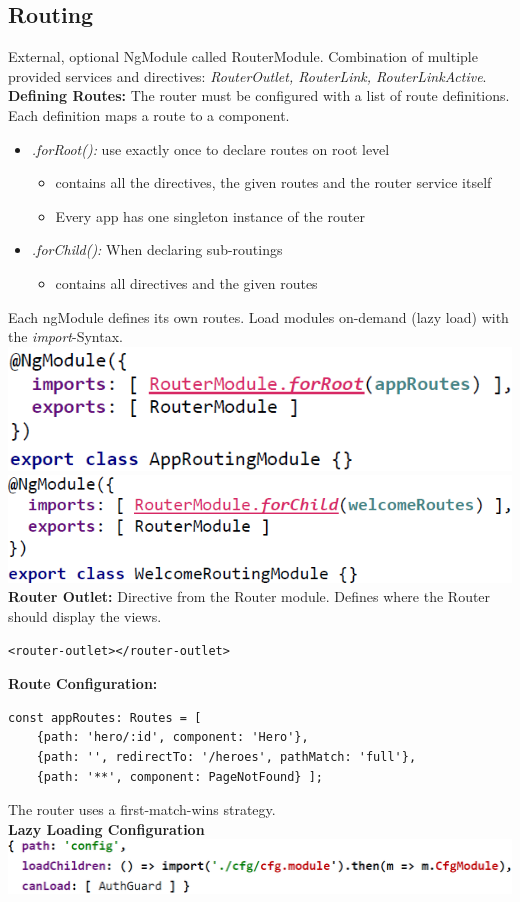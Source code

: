 \subsection{Routing}
External, optional NgModule called RouterModule.
Combination of multiple provided services and directives: \textit{RouterOutlet, RouterLink, RouterLinkActive}.\\
\textbf{Defining Routes:} The router must be configured with a list of route definitions.
Each definition maps a route to a component.
\begin{itemize}
    \item \textit{.forRoot():} use exactly once to declare routes on root level
    \begin{itemize}
        \item contains all the directives, the given routes and the router service itself
        \item Every app has one singleton instance of the router
    \end{itemize}
    \item \textit{.forChild():} When declaring sub-routings
    \begin{itemize}
        \item contains all directives and the given routes
    \end{itemize}
\end{itemize}
Each ngModule defines its own routes.
Load modules on-demand (lazy load) with the \textit{import}-Syntax.\\
\includegraphics[width=0.5\linewidth]{img/angular_routing.png}
\includegraphics[width=0.5\linewidth]{img/angular_routing2.png}
\textbf{Router Outlet:} Directive from the Router module.
Defines where the Router should display the views.
\begin{lstlisting}
<router-outlet></router-outlet>
\end{lstlisting}
\textbf{Route Configuration:}
\begin{lstlisting}
const appRoutes: Routes = [
    {path: 'hero/:id', component: 'Hero'},
    {path: '', redirectTo: '/heroes', pathMatch: 'full'},
    {path: '**', component: PageNotFound} ];
\end{lstlisting}
The router uses a first-match-wins strategy.\\
\textbf{Lazy Loading Configuration}\\
\includegraphics[width=0.8\linewidth]{img/angular_lazy_loading_routes.png}


